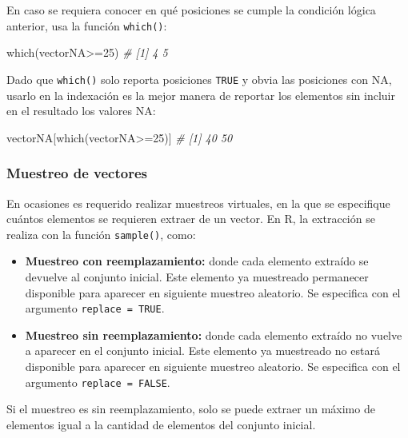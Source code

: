 \documentclass[
]{article}
\newenvironment{Shaded}{\begin{snugshade}}{\end{snugshade}}
\newcommand{\CommentTok}[1]{\textcolor[rgb]{0.56,0.35,0.01}{\textit{#1}}}
\newcommand{\DecValTok}[1]{\textcolor[rgb]{0.00,0.00,0.81}{#1}}
\newcommand{\FunctionTok}[1]{\textcolor[rgb]{0.00,0.00,0.00}{#1}}
\newcommand{\NormalTok}[1]{#1}
\newcommand{\SpecialCharTok}[1]{\textcolor[rgb]{0.00,0.00,0.00}{#1}}
\theoremstyle{definition}
\theoremstyle{definition}
\theoremstyle{definition}
\theoremstyle{definition}
\theoremstyle{remark}
\begin{document}
En caso se requiera conocer en qué posiciones se cumple la condición lógica anterior, usa la función \texttt{which()}:

\begin{Shaded}
\begin{Highlighting}[]
\FunctionTok{which}\NormalTok{(vectorNA}\SpecialCharTok{\textgreater{}=}\DecValTok{25}\NormalTok{)}
\CommentTok{\# [1] 4 5}
\end{Highlighting}
\end{Shaded}

Dado que \texttt{which()} solo reporta posiciones \texttt{TRUE} y obvia las posiciones con NA, usarlo en la indexación es la mejor manera de reportar los elementos sin incluir en el resultado los valores NA:

\begin{Shaded}
\begin{Highlighting}[]
\NormalTok{vectorNA[}\FunctionTok{which}\NormalTok{(vectorNA}\SpecialCharTok{\textgreater{}=}\DecValTok{25}\NormalTok{)]}
\CommentTok{\# [1] 40 50}
\end{Highlighting}
\end{Shaded}

\hypertarget{muestreo-de-vectores}{%
\subsubsection{Muestreo de vectores}\label{muestreo-de-vectores}}

En ocasiones es requerido realizar muestreos virtuales, en la que se especifique cuántos elementos se requieren extraer de un vector. En R, la extracción se realiza con la función \texttt{sample()}, como:

\begin{itemize}
\item
  \textbf{Muestreo con reemplazamiento:} donde cada elemento extraído se devuelve al conjunto inicial. Este elemento ya muestreado permanecer disponible para aparecer en siguiente muestreo aleatorio. Se especifica con el argumento \texttt{replace\ =\ TRUE}.
\item
  \textbf{Muestreo sin reemplazamiento:} donde cada elemento extraído no vuelve a aparecer en el conjunto inicial. Este elemento ya muestreado no estará disponible para aparecer en siguiente muestreo aleatorio. Se especifica con el argumento \texttt{replace\ =\ FALSE}.
\end{itemize}

Si el muestreo es sin reemplazamiento, solo se puede extraer un máximo de elementos igual a la cantidad de elementos del conjunto inicial.
\end{document}

